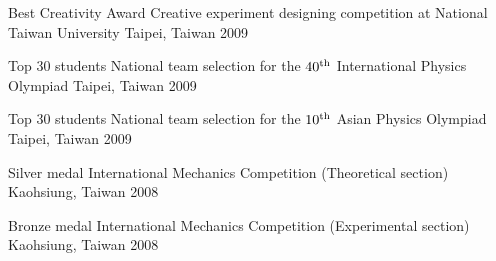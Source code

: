 




\begin{cvhonors}


\cvhonor
{Best Creativity Award} %
{Creative experiment designing competition at National Taiwan University} %
{Taipei, Taiwan} %
{2009} %


\cvhonor
{Top 30 students} %
{National team selection for the $40^{\rm th}$ International Physics Olympiad} %
{Taipei, Taiwan} %
{2009} %


\cvhonor
{Top 30 students} %
{National team selection for the $10^{\rm th}$ Asian Physics Olympiad} %
{Taipei, Taiwan} %
{2009} %


\cvhonor
{Silver medal} %
{International Mechanics Competition (Theoretical section)} %
{Kaohsiung, Taiwan} %
{2008} %


\cvhonor
{Bronze medal} %
{International Mechanics Competition (Experimental section)} %
{Kaohsiung, Taiwan} %
{2008} %



\end{cvhonors}
